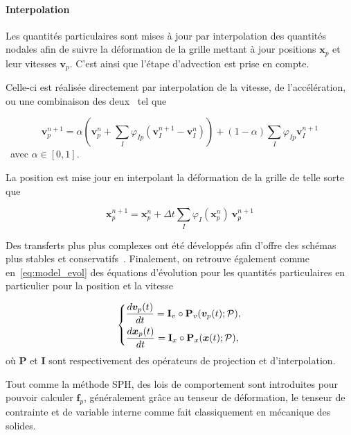 \paragraph*{Interpolation}

Les quantités particulaires sont mises à jour par interpolation des quantités nodales afin de suivre la déformation de la grille mettant à jour positions $\bm x_p$ et leur vitesses $\bm v_p$. C'est ainsi que l'étape d'advection est prise en compte.

Celle-ci est réalisée directement par interpolation de la vitesse, de l'accélération, ou une combinaison des deux~\cite{stomakhin2013material} tel que

\begin{equation*}
    \bm v_{p}^{n+1} = \alpha \left(\bm v_{p}^{n} + \sum_I \varphi_{Ip} (\bm v_I^{n+1} - \bm v_I^{n})\right) + (1- \alpha)\sum_I \varphi_{Ip} \bm v_I^{n+1}
\end{equation*}~avec $\alpha \in [0, 1]$.

La position est mise jour en interpolant la déformation de la grille de telle sorte que

\begin{equation*}
    \bm x_p^{n+1} = \bm x_p^{n} + \Delta t \sum_I \varphi_I(\bm x_p^n)~\bm v_p^{n+1}
\end{equation*}

Des transferts plus plus complexes ont été développés afin d'offre des schémas plus stables et conservatifs~\cite{jiang_affine_2015,fu_polynomial_2017,hu_moving_2018}. Finalement, on retrouve également comme en~\eqref{eq:model_evol} des équations d'évolution pour les quantités particulaires en particulier pour la position et la vitesse

\begin{gather}
    \left\{\begin{aligned}
         & \frac{d\bm v_p(t)}{dt} = \mathbf I_v \circ \mathbf P_v(\bm v_p(t);\mathcal P), \\
         & \frac{d \bm{x}_p(t)}{d t} = \mathbf I_x \circ \mathbf P_x(\bm{x}(t);\mathcal P),
    \end{aligned} \right.
\end{gather}où $\mathbf P$ et $\mathbf I$ sont respectivement des opérateurs de projection et d'interpolation.

Tout comme la méthode SPH, des lois de comportement sont introduites pour pouvoir calculer $\bm f_p$, généralement grâce au tenseur de déformation, le tenseur de contrainte et de variable interne comme fait classiquement en mécanique des solides.

